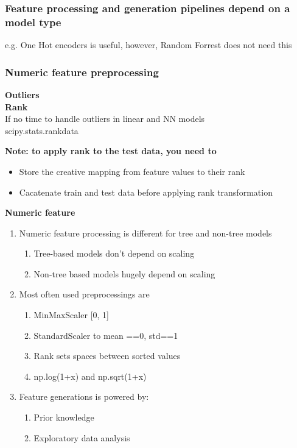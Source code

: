 \documentclass[11pt, twoside]{article}   	%
\begin{document}
\subsubsection{Feature processing and generation pipelines depend on a model type}
\textup{e.g. One Hot encoders is useful, however, Random Forrest does not need this}

%
\subsubsection{Numeric feature preprocessing}
\textbf{Outliers}
\\\textbf{Rank}
\\\indent If no time to handle outliers in linear and NN models 
\\\indent scipy.stats.rankdata

\textbf {Note: to apply rank to the test data, you need to}
\begin{itemize}
  \item Store the creative mapping from feature values to their rank
  \item Cacatenate train and test data before applying rank transformation 
\end{itemize}

\noindent \textbf{Numeric feature}
\renewcommand{\labelenumii}{\alph{enumii}}
\begin{enumerate}
  \item Numeric feature processing is different for tree and non-tree models
    \begin{enumerate}
      \item Tree-based models don't depend on scaling
      \item Non-tree based models hugely depend on scaling
    \end{enumerate}
    
      \item Most often used preprocessings are
        \begin{enumerate}
           \item MinMaxScaler [0, 1]
           \item StandardScaler to mean ==0, std==1 
           \item Rank sets spaces between sorted values
           \item np.log(1+x) and np.sqrt(1+x)
    \end{enumerate}
    

      \item Feature generations is powered by: 
        \begin{enumerate}
           \item Prior knowledge 
           \item Exploratory data analysis
    \end{enumerate}
    
  \end{enumerate}
%
\end{document}

